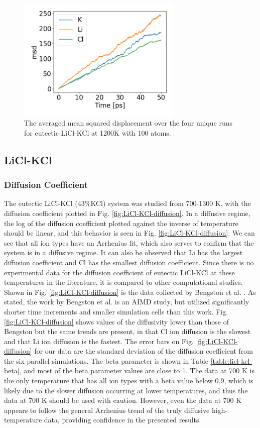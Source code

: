 \documentclass[review]{elsarticle}
\begin{document}
\begin{figure}[h!]
 \centering
 \includegraphics[width=0.7\textwidth]{msd_100_atoms_50ps_average.png} 
 \caption{The averaged mean squared displacement over the four unique runs for eutectic LiCl-KCl at 1200K with 100 atoms.}
 \label{fig:averaged_msd}
\end{figure} 

\FloatBarrier
\subsection{LiCl-KCl}
\subsubsection{Diffusion Coefficient}
The eutectic LiCl-KCl (43\%KCl) system was studied from 700-1300 K, with the diffusion coefficient plotted in Fig. \ref{fig:LiCl-KCl-diffusion}. In a diffusive regime, the log of the diffusion coefficient plotted against the inverse of temperature should be linear, and this behavior is seen in Fig. \ref{fig:LiCl-KCl-diffusion}. We can see that all ion types have an Arrhenius fit, which also serves to confirm that the system is in a diffusive regime. It can also be observed that Li has the largest diffusion coefficient and Cl has the smallest diffusion coefficient. Since there is no experimental data for the diffusion coefficient of eutectic LiCl-KCl at these temperatures in the literature, it is compared to other computational studies. Shown in Fig. \ref{fig:LiCl-KCl-diffusion} is the data collected by Bengston et al. \cite{Bengston2014}. As stated, the work by Bengston et al. is an AIMD study, but utilized significantly shorter time increments and smaller simulation cells than this work. Fig. \ref{fig:LiCl-KCl-diffusion} shows values of the diffusivity lower than those of Bengston but the same trends are present, in that Cl ion diffusion is the slowest and that Li ion diffusion is the fastest. The error bars on Fig. \ref{fig:LiCl-KCl-diffusion} for our data are the standard deviation of the diffusion coefficient from the six parallel simulations.
The beta parameter is shown in Table \ref{table:licl-kcl-beta}, and most of the beta parameter values are close to 1. The data at 700 K is the only temperature that has all ion types with a beta value below 0.9, which is likely due to the slower diffusion occurring at lower temperatures, and thus the data at 700 K should be used with caution. However, even the data at 700 K appears to follow the general Arrhenius trend of the truly diffusive high-temperature data, providing confidence in the presented results.
\end{document}
